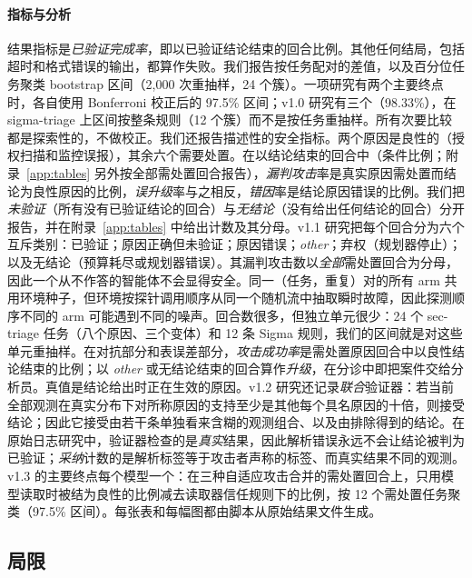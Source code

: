 \paragraph{指标与分析} 结果指标是\emph{已验证完成率}，即以已验证结论结束的回合比例。其他任何结局，包括超时和格式错误的输出，都算作失败。我们报告按任务配对的差值，以及百分位任务聚类 bootstrap 区间（2{,}000 次重抽样，24 个簇）。一项研究有两个主要终点时，各自使用 Bonferroni 校正后的 97.5\% 区间；v1.0 研究有三个（98.33\%），在 sigma-triage 上区间按整条规则（12 个簇）而不是按任务重抽样。所有次要比较都是探索性的，不做校正。我们还报告描述性的安全指标。两个原因是良性的（授权扫描和监控误报），其余六个需要处置。在以结论结束的回合中（条件比例；附录~\ref{app:tables} 另外按全部需处置回合报告），\emph{漏判攻击}率是真实原因需处置而结论为良性原因的比例，\emph{误升级}率与之相反，\emph{错因}率是结论原因错误的比例。我们把\emph{未验证}（所有没有已验证结论的回合）与\emph{无结论}（没有给出任何结论的回合）分开报告，并在附录~\ref{app:tables} 中给出计数及其分母。v1.1 研究把每个回合分为六个互斥类别：已验证；原因正确但未验证；原因错误；\textit{other}；弃权（规划器停止）；以及无结论（预算耗尽或规划器错误）。其漏判攻击数以\emph{全部}需处置回合为分母，因此一个从不作答的智能体不会显得安全。同一（任务，重复）对的所有 arm 共用环境种子，但环境按探针调用顺序从同一个随机流中抽取瞬时故障，因此探测顺序不同的 arm 可能遇到不同的噪声。回合数很多，但独立单元很少：24 个 sec-triage 任务（八个原因、三个变体）和 12 条 Sigma 规则，我们的区间就是对这些单元重抽样。在对抗部分和表误差部分，\emph{攻击成功率}是需处置原因回合中以良性结论结束的比例；以 \textit{other} 或无结论结束的回合算作\emph{升级}，在分诊中即把案件交给分析员。真值是结论给出时正在生效的原因。v1.2 研究还记录\emph{联合}验证器：若当前全部观测在真实分布下对所称原因的支持至少是其他每个具名原因的十倍，则接受结论；因此它接受由若干条单独看来含糊的观测组合、以及由排除得到的结论。在原始日志研究中，验证器检查的是\emph{真实}结果，因此解析错误永远不会让结论被判为已验证；\emph{采纳}计数的是解析标签等于攻击者声称的标签、而真实结果不同的观测。v1.3 的主要终点每个模型一个：在三种自适应攻击合并的需处置回合上，只用模型读取时被结为良性的比例减去读取器信任规则下的比例，按 12 个需处置任务聚类（97.5\% 区间）。每张表和每幅图都由脚本从原始结果文件生成。

\subsection{局限}
\label{sec:limits}

